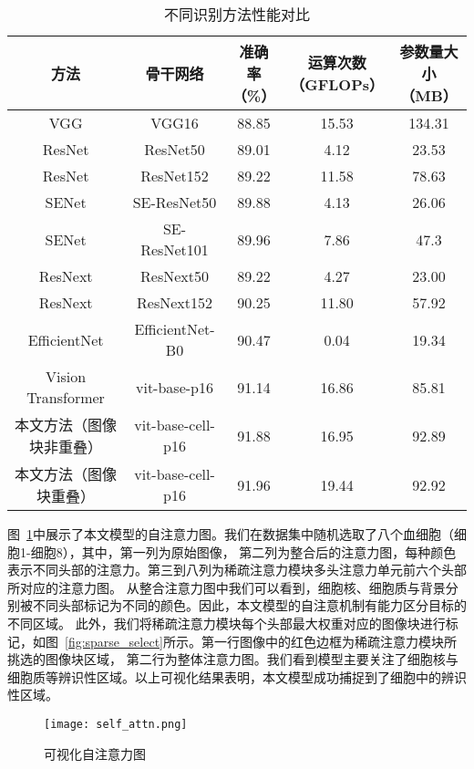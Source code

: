 \begin{table}
  \caption{不同识别方法性能对比}   
  \centering 
  \label{table:cell_con}
  \begin{tabular}{ccccc}
    \toprule[2pt]
    方法 & 骨干网络  &  \makecell{准确率 \\（\%）} & \makecell{运算次数 \\（GFLOPs）} & \makecell{参数量大小\\（MB）} \\
    \midrule[1.5pt] 
    VGG                & VGG16             & 88.85 & 15.53 & 134.31 \\
    ResNet             & ResNet50          & 89.01 & 4.12  & 23.53  \\
    ResNet             & ResNet152         & 89.22 & 11.58 & 78.63  \\
    SENet              & SE-ResNet50       & 89.88 & 4.13  & 26.06  \\
    SENet              & SE-ResNet101      & 89.96 & 7.86  & 47.3   \\
    ResNext            & ResNext50         & 89.22 & 4.27  & 23.00  \\
    ResNext            & ResNext152        & 90.25 & 11.80 & 57.92  \\
    EfficientNet       & EfficientNet-B0   & 90.47 & 0.04  & 19.34  \\
    \hline
    Vision Transformer & vit-base-p16      & 91.14 & 16.86 & 85.81  \\
    本文方法（图像块非重叠）       & vit-base-cell-p16 & 91.88 & 16.95 & 92.89  \\
    本文方法（图像块重叠）        & vit-base-cell-p16 & 91.96 & 19.44 & 92.92\\ 
    \bottomrule[2pt]      
  \end{tabular} 
\end{table}

图~\ref{fig:self_attn}中展示了本文模型的自注意力图。我们在数据集中随机选取了八个血细胞（细胞1-细胞8），其中，第一列为原始图像，
第二列为整合后的注意力图，每种颜色表示不同头部的注意力。第三到八列为稀疏注意力模块多头注意力单元前六个头部所对应的注意力图。
从整合注意力图中我们可以看到，细胞核、细胞质与背景分别被不同头部标记为不同的颜色。因此，本文模型的自注意机制有能力区分目标的不同区域。
此外，我们将稀疏注意力模块每个头部最大权重对应的图像块进行标记，如图~\ref{fig:sparse_select}所示。第一行图像中的红色边框为稀疏注意力模块所挑选的图像块区域，
第二行为整体注意力图。我们看到模型主要关注了细胞核与细胞质等辨识性区域。以上可视化结果表明，本文模型成功捕捉到了细胞中的辨识性区域。
\begin{figure} 
  \centering   
  \texttt{[image: self\_attn.png]}   
  \caption{可视化自注意力图}   
  \label{fig:self_attn} 
\end{figure}  

